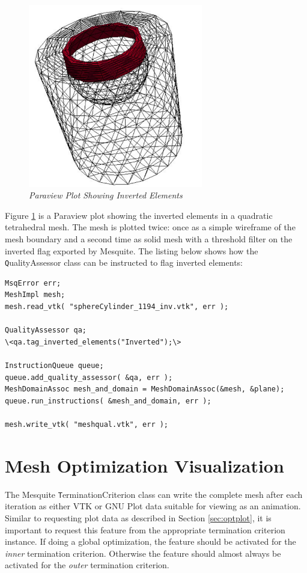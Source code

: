 \begin{figure}[htb!]
\begin{center}
\includegraphics[width=3in]{figures/meshqual3d}
\caption{\em Paraview Plot Showing Inverted Elements \label{fig:meshqual3d}}
\end{center}
\end{figure}

Figure \ref{fig:meshqual3d} is a Paraview plot showing the inverted elements in a quadratic tetrahedral mesh.  The mesh is plotted twice: once as a simple wireframe of the mesh boundary and a second time as solid mesh with a threshold filter on the inverted flag exported by Mesquite.  The listing below shows how the {\texttt QualityAssessor} class can be instructed to flag inverted elements:

\newpage
\begin{lstlisting}[frame=single]
MsqError err;
MeshImpl mesh;
mesh.read_vtk( "sphereCylinder_1194_inv.vtk", err );

QualityAssessor qa;
\<qa.tag_inverted_elements("Inverted");\>

InstructionQueue queue;
queue.add_quality_assessor( &qa, err );
MeshDomainAssoc mesh_and_domain = MeshDomainAssoc(&mesh, &plane);
queue.run_instructions( &mesh_and_domain, err );

mesh.write_vtk( "meshqual.vtk", err );
\end{lstlisting}


\section{Mesh Optimization Visualization}

The Mesquite {\texttt TerminationCriterion} class can write the complete mesh after each iteration as either VTK or GNU Plot data suitable for viewing as an animation.	 Similar to requesting plot data as described in Section \ref {sec:optplot}, it is important to request this feature from the appropriate termination criterion instance.  If doing a global optimization, the feature should be activated for the {\em inner} termination criterion.  Otherwise the feature should almost always be activated for the {\em outer} termination criterion.

